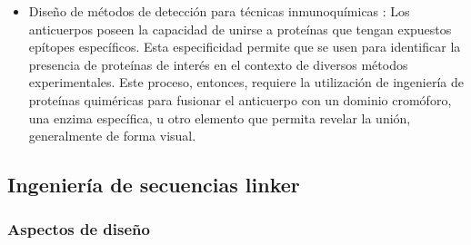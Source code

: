 \begin{itemize}
\item Diseño de métodos de detección para técnicas inmunoquímicas \cite{arai1998construction,arai2000fluorolabeling,suzuki1999open}:
Los anticuerpos poseen la capacidad de unirse a proteínas que tengan expuestos epítopes específicos. 
Esta especificidad permite que se usen para identificar la presencia de proteínas de interés en el contexto de diversos métodos experimentales.
Este proceso, entonces, requiere la utilización de ingeniería de proteínas quiméricas para fusionar el anticuerpo con un dominio cromóforo, una enzima específica, u otro elemento que permita revelar la unión, generalmente de forma visual.


\end{itemize}













\subsection{Ingeniería de secuencias linker}

\subsubsection{Aspectos de diseño}\label{aspectosDiseno}
% 
% 
% 




